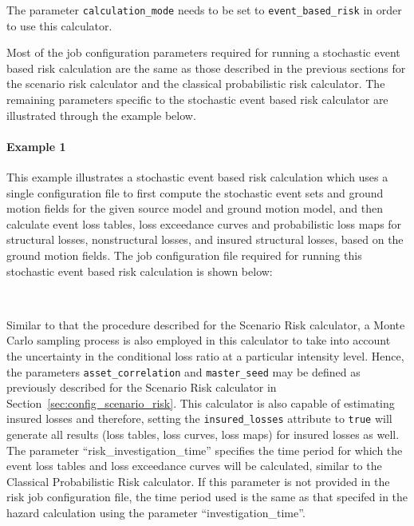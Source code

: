The parameter \Verb+calculation_mode+ needs to be set to
\Verb+event_based_risk+ in order to use this calculator.

Most of the job configuration parameters required for running a stochastic
event based risk calculation are the same as those described in the previous
sections for the scenario risk calculator and the classical probabilistic risk
calculator. The remaining parameters specific to the stochastic event based
risk calculator are illustrated through the example below.


\paragraph{Example 1}

This example illustrates a stochastic event based risk calculation which uses
a single configuration file to first compute the stochastic event sets and
ground motion fields for the given source model and ground motion model, and
then calculate event loss tables, loss exceedance curves and probabilistic
loss maps for structural losses, nonstructural losses, and insured structural
losses, based on the ground motion fields. The job configuration file required
for running this stochastic event based risk calculation is shown below:

\inputminted[firstline=1,firstnumber=1,fontsize=\footnotesize,frame=single,bgcolor=lightgray,label=job.ini]{ini}{oqum/risk/verbatim/config_event_based_risk_combined.ini}\\

Similar to that the procedure described for the Scenario Risk calculator, a
Monte Carlo sampling process is also employed in this calculator to take into
account the uncertainty in the conditional loss ratio at a particular
intensity level. Hence, the parameters \Verb+asset_correlation+ and
\Verb+master_seed+ may be defined as previously described for the Scenario
Risk calculator in Section~\ref{sec:config_scenario_risk}. This calculator is
also capable of estimating insured losses and therefore, setting the
\Verb+insured_losses+ attribute to \Verb+true+ will generate all results (loss
tables, loss curves, loss maps) for insured losses as well. The parameter
``risk\_investigation\_time'' specifies the time period for which the event
loss tables and loss exceedance curves will be calculated, similar to the
Classical Probabilistic Risk calculator. If this parameter is not provided in
the risk job configuration file, the time period used is the same as that
specifed in the hazard calculation using the parameter ``investigation\_time''.

